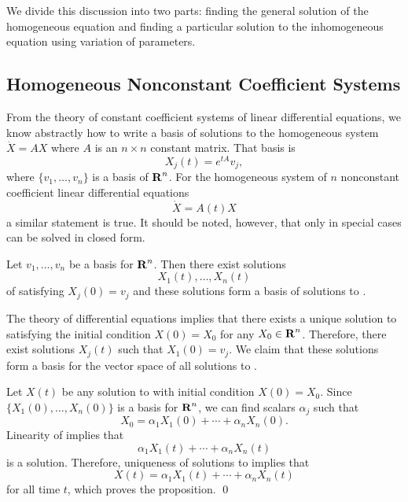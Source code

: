 \documentclass{ximera}
\begin{document}
We divide this discussion into two parts: finding the 
general solution 
of the homogeneous equation and finding 
a particular 
solution to the 
inhomogeneous equation using variation of parameters.

\subsection*{Homogeneous Nonconstant Coefficient Systems}

From the theory of constant coefficient systems of linear differential 
equations, we know abstractly how to write  a  basis of solutions to
the homogeneous system  $\dot{X}=AX$ where $A$ is an $n\times n$
constant matrix.  That basis is 
\[
X_j(t) = e^{tA}v_j,
\]
where $\{v_1,\ldots,v_n\}$ is a basis of $\mbox{$\bf{R}$}^n$.  For the 
homogeneous 
system of $n$ nonconstant coefficient linear differential equations
\begin{equation}  \label{E:NCCH}
\dot{X} = A(t) X
\end{equation}
a similar statement is true.   It should be noted, however, that only in 
special cases can  be solved in closed form.

\begin{prop}  \label{P:NCCH}
Let $v_1,\ldots,v_n$ be a basis 
for $\mbox{$\bf{R}$}^n$.  Then there exist solutions 
\[
X_1(t),\ldots,X_n(t)
\]
of  satisfying $X_j(0)=v_j$ and these
solutions form a basis of solutions 
to .
\end{prop}

\proof The theory of differential equations implies that there exists a 
unique solution to   satisfying the initial condition $X(0)=X_0$ 
for any $X_0\in\mbox{$\bf{R}$}^n$.   Therefore, there exist solutions $X_j(t)$ such that 
$X_1(0)=v_j$.  We claim that these solutions form a basis for the vector 
space of all solutions to .   

Let $X(t)$ be any solution to  with initial condition $X(0)=X_0$. 
Since $\{X_1(0),\ldots,X_n(0)\}$ is a basis for $\mbox{$\bf{R}$}^n$, we can find scalars 
$\alpha_j$ such that 
\[
X_0 = \alpha_1X_1(0) + \cdots + \alpha_nX_n(0).
\]
Linearity of  implies that 
\[
\alpha_1X_1(t) + \cdots + \alpha_nX_n(t)
\]
is a solution.  Therefore, uniqueness of solutions to  implies 
that 
\[
X(t) = \alpha_1X_1(t) + \cdots + \alpha_nX_n(t)
\]
for all time $t$, which proves the proposition. \qed
\end{document}
